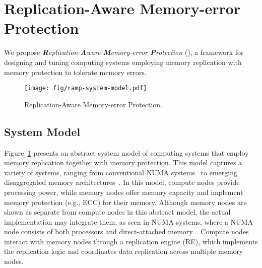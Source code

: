 \section{Replication-Aware Memory-error Protection}
\label{sec:shepherd}

We propose \emph{\textbf{R}eplication-\textbf{A}ware \textbf{M}emory-error \textbf{P}rotection} (\ramp), a framework for designing and tuning computing systems employing memory replication with memory protection to tolerate memory errors.


\begin{figure}[!t]
\centering
\texttt{[image: fig/ramp-system-model.pdf]}
\caption{Replication-Aware Memory-error Protection.}
\label{fig:ramp-architecture}
\end{figure}

\subsection{System Model}
Figure~\ref{fig:ramp-architecture} presents an abstract system model of computing systems that employ memory replication together with memory protection.
This model captures a variety of systems, ranging from conventional NUMA systems~\cite{patil:dve:isca:2021} to emerging disaggregated memory architectures~\cite{lee:hydra:fast:2022, zhou:carbink:osdi:2022, tsai:dpm:atc:2020, shan:legoos:osdi:2018}.
In this model, compute nodes provide processing power, while memory nodes offer memory capacity and implement memory protection (e.g., ECC) for their memory. 
Although memory nodes are shown as separate from compute nodes in this abstract model, the actual implementation may integrate them, as seen in NUMA systems, where a NUMA node consists of both processors and direct-attached memory~\cite{patil:dve:isca:2021}. Compute nodes interact with memory nodes through a replication engine (RE), which implements the replication logic and coordinates data replication across multiple memory nodes.



